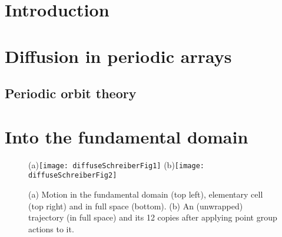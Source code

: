 \documentclass[aps,pre,
                showpacs,
                twocolumn,
                groupedaddress,
                floatfix]{revtex4-1}
\begin{document}

\section{Introduction}
\label{s-intro}
  

\section{Diffusion in periodic arrays}
\label{s-DiffPerArr}
  

\subsection{Periodic orbit theory}
\label{s-POT}
  


\section{Into the fundamental domain}
\label{s-SymmetryReduction}
\begin{figure}[htbp]
  \begin{center}
    (a)\texttt{[image: diffuseSchreiberFig1]}
    (b)\texttt{[image: diffuseSchreiberFig2]}
  \end{center}
  \caption[]{\label{fig-schrieberFig12}
  (a) Motion in the fundamental domain (top left), elementary cell (top
      right) and  in full space (bottom).
  (b) An (unwrapped) trajectory (in full  space) and its 12 copies after
      applying point group actions to it.
  }
\end{figure}

\end{document}
